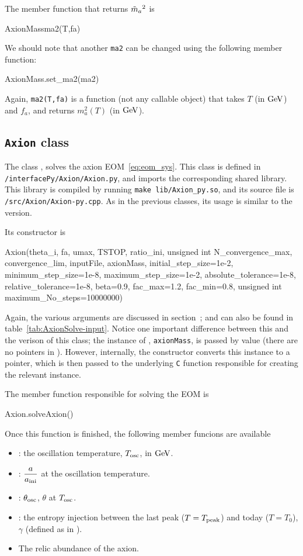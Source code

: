 \documentclass[11pt,a4paper]{article}
\begin{document}
The member function that returns $\tilde m_{a}{}^2$ is
%
\begin{py}
	AxionMassma2(T,fa)
\end{py}
%
We should note that another {\tt ma2} can be changed using the following member function:
%
\begin{py}
	AxionMass.set_ma2(ma2)
\end{py}
%
Again, {\tt ma2(T,fa)} is a function (not any callable object) that takes $T$ (in ${\rm GeV}$) and $f_a$, and returns  $m_a^2(T)$ (in ${\rm GeV}$).




\subsection{{\tt Axion} class}
%
The class , solves the axion EOM~\ref{eq:eom_sys}. This class is defined in {\tt \mimes/interfacePy/Axion/Axion.py}, and imports the corresponding shared library. This library is compiled by running {\tt make lib/Axion\_py.so}, and its source file is {\tt \mimes/src/Axion/Axion-py.cpp}. As in the previous classes, its usage is similar to the \CPP version.

Its constructor is 
%
\begin{py}
	Axion(theta_i, fa, umax, TSTOP, 
			ratio_ini, unsigned int N_convergence_max, convergence_lim, 
			inputFile, axionMass, initial_step_size=1e-2, 
			minimum_step_size=1e-8, maximum_step_size=1e-2, absolute_tolerance=1e-8, 
			relative_tolerance=1e-8, beta=0.9, fac_max=1.2, fac_min=0.8, 
			unsigned int maximum_No_steps=10000000)
\end{py}
%
Again, the various arguments are discussed in section~; and can also be found in table~\ref{tab:AxionSolve-input}. Notice one important difference between this and the \CPP verison of this class; the instance of , {\tt axionMass}, is passed by value (there are no pointers in \PY). However, internally, the constructor converts this instance to a pointer, which is then passed to the underlying {\tt C} function responsible for creating the relevant instance.
%

The member function responsible for solving the EOM is
%
\begin{py}
	Axion.solveAxion()
\end{py}
%
Once this function is finished, the following member funcions are available
\begin{itemize}
	\item {}: the oscillation temperature, $T_{\rm osc}{}$, in ${\rm GeV}$.
	\item {}: $\dfrac{a}{a_{\rm ini}{}}$ at the oscillation temperature.
	\item {}: $\theta_{\rm osc}{}$, \ie $\theta$ at $T_{\rm osc}{}$.
	\item  {}: the entropy injection between the last peak ($T=T_{\rm peak}$) and today ($T=T_0$), $\gamma$ (defined as in ).
	\item {} The relic abundance of the axion.
\end{itemize}
\end{document}
